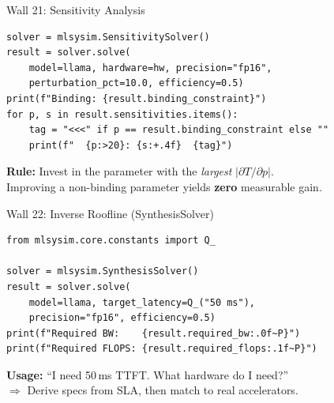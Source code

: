 \documentclass[aspectratio=169, 12pt]{beamer}
\begin{document}
\begin{frame}[fragile]{Wall 21: Sensitivity Analysis}
\begin{lstlisting}
solver = mlsysim.SensitivitySolver()
result = solver.solve(
    model=llama, hardware=hw, precision="fp16",
    perturbation_pct=10.0, efficiency=0.5)
print(f"Binding: {result.binding_constraint}")
for p, s in result.sensitivities.items():
    tag = "<<<" if p == result.binding_constraint else ""
    print(f"  {p:>20}: {s:+.4f}  {tag}")
\end{lstlisting}

\vspace{0.3em}
\small
\textbf{Rule:} Invest in the parameter with the \emph{largest} $|\partial T / \partial p|$.\\
Improving a non-binding parameter yields \textbf{zero} measurable gain.
\end{frame}

\begin{frame}[fragile]{Wall 22: Inverse Roofline (SynthesisSolver)}
\begin{lstlisting}
from mlsysim.core.constants import Q_

solver = mlsysim.SynthesisSolver()
result = solver.solve(
    model=llama, target_latency=Q_("50 ms"),
    precision="fp16", efficiency=0.5)
print(f"Required BW:    {result.required_bw:.0f~P}")
print(f"Required FLOPS: {result.required_flops:.1f~P}")
\end{lstlisting}

\vspace{0.5em}
\textbf{Usage:} ``I need 50\,ms TTFT. What hardware do I need?''\\
$\Rightarrow$ Derive specs from SLA, then match to real accelerators.
\end{frame}
\end{document}
